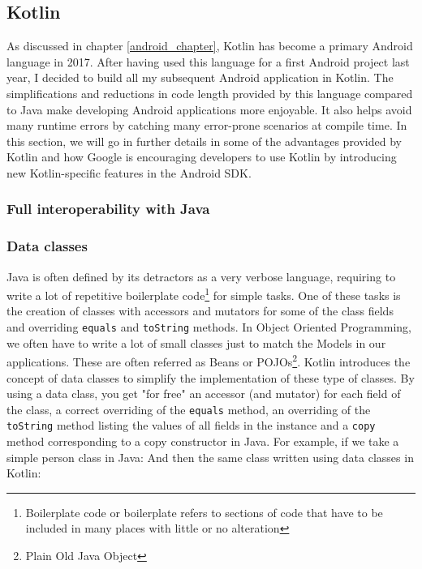 \documentclass[11pt,a4paper]{report}
\begin{document}
\subsection{Kotlin}
\label{kotlin}
As discussed in chapter \ref{android_chapter}, Kotlin has become a primary Android language in 2017. After having used this language for a first Android project last year, I decided to build all my subsequent Android application in Kotlin. The simplifications and reductions in code length provided by this language compared to Java make developing Android applications more enjoyable. It also helps avoid many runtime errors by catching many error-prone scenarios at compile time. In this section, we will go in further details in some of the advantages provided by Kotlin and how Google is encouraging developers to use Kotlin by introducing new Kotlin-specific features in the Android SDK.
\subsubsection{Full interoperability with Java}
\subsubsection{Data classes}
Java is often defined by its detractors as a very verbose language, requiring to write a lot of repetitive boilerplate code\footnote{Boilerplate code or boilerplate refers to sections of code that have to be included in many places with little or no alteration\cite{wiki:define:boilerplate}} for simple tasks. One of these tasks is the creation of classes with accessors and mutators for some of the class fields and overriding \verb+equals+ and \verb+toString+ methods. In Object Oriented Programming, we often have to write a lot of small classes just to match the Models in our applications. These are often referred as Beans or POJOs\footnote{Plain Old Java Object}. Kotlin introduces the concept of data classes\cite{kotlin:doc:data_classes} to simplify the implementation of these type of classes. By using a data class, you get "for free" an accessor (and mutator) for each field of the class, a correct overriding of the \verb+equals+ method, an overriding of the \verb+toString+ method listing the values of all fields in the instance and a \verb+copy+ method corresponding to a copy constructor in Java. For example, if we take a simple person class in Java:
And then the same class written using data classes in Kotlin:
\end{document}
